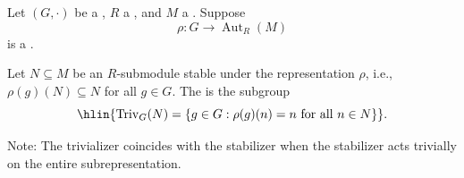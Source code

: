 
\begin{definition} \label{definition:trivializer_of_a_subrepresentation_of_a_representation_of_a_group_on_a_left_module}
Let $(G, \cdot)$ be a , $R$ a , and $M$ a . Suppose 
$$\rho : G \to \operatorname{Aut}_R(M)$$
is a .

Let $N \subseteq M$ be an $R$-submodule stable under the representation $\rho$, i.e., $\rho(g)(N) \subseteq N$ for all $g \in G$.
The  is the subgroup
$$\hlin{\operatorname{Triv}_G(N) = \{ g \in G : \rho(g)(n) = n \text{ for all } n \in N \}}.$$

Note: The trivializer coincides with the stabilizer when the stabilizer acts trivially on the entire subrepresentation.
\end{definition}
